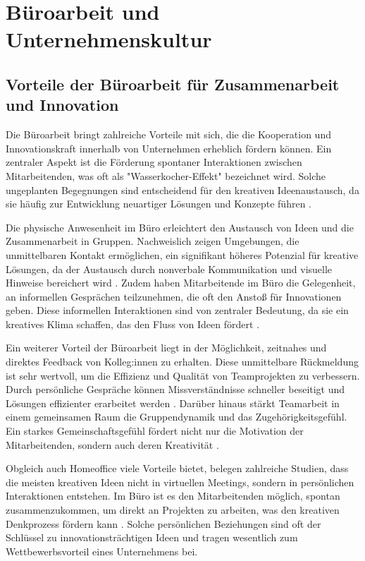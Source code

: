 \section{Büroarbeit und Unternehmenskultur}

\subsection{Vorteile der Büroarbeit für Zusammenarbeit und Innovation}

Die Büroarbeit bringt zahlreiche Vorteile mit sich, die die Kooperation und Innovationskraft innerhalb von Unternehmen erheblich fördern können. Ein zentraler Aspekt ist die Förderung spontaner Interaktionen zwischen Mitarbeitenden, was oft als "Wasserkocher-Effekt" bezeichnet wird. Solche ungeplanten Begegnungen sind entscheidend für den kreativen Ideenaustausch, da sie häufig zur Entwicklung neuartiger Lösungen und Konzepte führen \cite{file4}.

Die physische Anwesenheit im Büro erleichtert den Austausch von Ideen und die Zusammenarbeit in Gruppen. Nachweislich zeigen Umgebungen, die unmittelbaren Kontakt ermöglichen, ein signifikant höheres Potenzial für kreative Lösungen, da der Austausch durch nonverbale Kommunikation und visuelle Hinweise bereichert wird \cite{file4}. Zudem haben Mitarbeitende im Büro die Gelegenheit, an informellen Gesprächen teilzunehmen, die oft den Anstoß für Innovationen geben. Diese informellen Interaktionen sind von zentraler Bedeutung, da sie ein kreatives Klima schaffen, das den Fluss von Ideen fördert \cite{file4}.

Ein weiterer Vorteil der Büroarbeit liegt in der Möglichkeit, zeitnahes und direktes Feedback von Kolleg:innen zu erhalten. Diese unmittelbare Rückmeldung ist sehr wertvoll, um die Effizienz und Qualität von Teamprojekten zu verbessern. Durch persönliche Gespräche können Missverständnisse schneller beseitigt und Lösungen effizienter erarbeitet werden \cite{file4}. Darüber hinaus stärkt Teamarbeit in einem gemeinsamen Raum die Gruppendynamik und das Zugehörigkeitsgefühl. Ein starkes Gemeinschaftsgefühl fördert nicht nur die Motivation der Mitarbeitenden, sondern auch deren Kreativität \cite{file4}.

Obgleich auch Homeoffice viele Vorteile bietet, belegen zahlreiche Studien, dass die meisten kreativen Ideen nicht in virtuellen Meetings, sondern in persönlichen Interaktionen entstehen. Im Büro ist es den Mitarbeitenden möglich, spontan zusammenzukommen, um direkt an Projekten zu arbeiten, was den kreativen Denkprozess fördern kann \cite{file4}. Solche persönlichen Beziehungen sind oft der Schlüssel zu innovationsträchtigen Ideen und tragen wesentlich zum Wettbewerbsvorteil eines Unternehmens bei.

